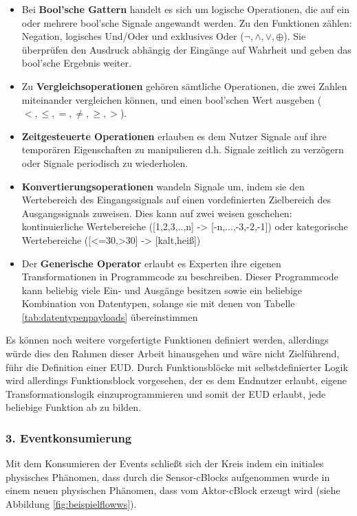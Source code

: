  \begin{itemize} 
     \item Bei \textbf{Bool'sche Gattern} handelt es sich um logische Operationen, die auf ein oder mehrere bool'sche Signale angewandt werden. Zu den Funktionen zählen: Negation, logisches Und/Oder und exklusives Oder ($\neg, \land, \lor, \oplus$). Sie überprüfen den Ausdruck abhängig der Eingänge auf Wahrheit und geben das bool'sche Ergebnis weiter.
     \item Zu \textbf{Vergleichsoperationen} gehören sämtliche Operationen, die zwei Zahlen miteinander vergleichen können, und einen bool'schen Wert ausgeben ($<,\leq,=,\neq,\geq,>$).
     \item \textbf{Zeitgesteuerte Operationen} erlauben es dem Nutzer Signale auf ihre temporären Eigenschaften zu manipulieren d.h. Signale zeitlich zu verzögern oder Signale periodisch zu wiederholen.
     \item \textbf{Konvertierungsoperationen} wandeln Signale um, indem sie den Wertebereich des Eingangssignals auf einen vordefinierten Zielbereich des Ausgangssignals zuweisen. Dies kann auf zwei weisen geschehen: kontinuierliche Wertebereiche ([1,2,3,..,n] -> [-n,...,-3,-2,-1]) oder kategorische Wertebereiche ([<=30,>30] -> [kalt,heiß])
     \item Der \textbf{Generische Operator} erlaubt es Experten ihre eigenen Transformationen in Programmcode zu beschreiben. Dieser Programmcode kann beliebig viele Ein- und Ausgänge besitzen sowie ein beliebige Kombination von Datentypen, solange sie mit denen von Tabelle \ref{tab:datentypenpayloads} übereinstimmen
 \end{itemize}
 Es können noch weitere vorgefertigte Funktionen definiert werden, allerdings würde dies den Rahmen dieser Arbeit hinausgehen und wäre nicht Zielführend, führ die Definition einer \ac{EUD}. Durch Funktionsblöcke mit selbstdefinierter Logik wird allerdings Funktionsblock vorgesehen, der es dem Endnutzer erlaubt, eigene Transformationslogik einzuprogrammieren und somit der \ac{EUD} erlaubt, jede beliebige Funktion ab zu bilden.
 
\subsubsection{3. Eventkonsumierung}
Mit dem Konsumieren der Events schließt sich der Kreis indem ein initiales physisches Phänomen, dass durch die Sensor-cBlocks aufgenommen wurde in einem neuen physischen Phänomen, dass vom Aktor-cBlock erzeugt wird (siehe Abbildung \ref{fig:beispielflowws}). 

